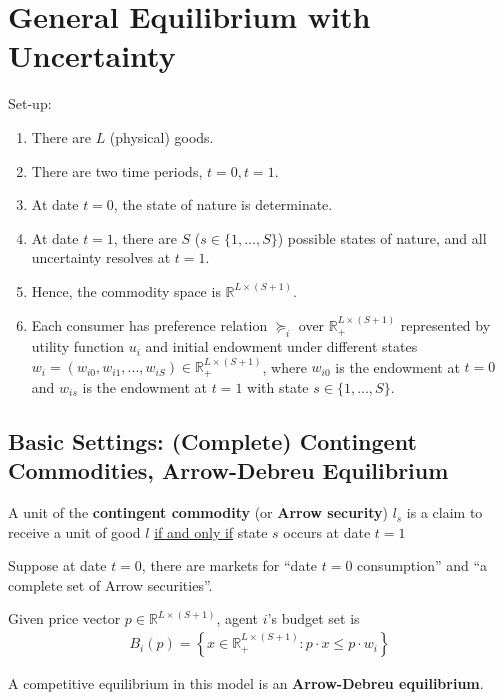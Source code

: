 \documentclass[11pt]{elegantbook}
\begin{document}
\section{General Equilibrium with Uncertainty}
Set-up:
\begin{enumerate}
    \item There are $L$ (physical) goods.
    \item There are two time periods, $t=0,t=1$.
    \item At date $t=0$, the state of nature is determinate.
    \item At date $t=1$, there are $S$ ($s\in\{1,...,S\}$) possible states of nature, and all uncertainty resolves at $t=1$.
    \item Hence, the commodity space is $\mathbb{R}^{L\times(S+1)}$.
    \item Each consumer has preference relation $\succeq_i$ over $\mathbb{R}_+^{L\times(S+1)}$ represented by utility function $u_i$ and initial endowment under different states $w_i=(w_{i0},w_{i1},...,w_{iS})\in \mathbb{R}_+^{L\times(S+1)}$, where $w_{i0}$ is the endowment at $t=0$ and $w_{is}$ is the endowment at $t=1$ with state $s\in\{1,...,S\}$.
\end{enumerate}

\subsection{Basic Settings: (Complete) Contingent Commodities, Arrow-Debreu Equilibrium}
\begin{definition}
    \normalfont
    A unit of the \textbf{contingent commodity} (or \textbf{Arrow security}) $l_s$ is a claim to receive a unit of good $l$ \underline{if and only if} state $s$ occurs at date $t=1$
\end{definition}
Suppose at date $t=0$, there are markets for ``date $t=0$ consumption'' and ``a complete set of Arrow securities''.

Given price vector $p\in \mathbb{R}^{L\times (S+1)}$, agent $i$'s budget set is
\begin{equation}
    \begin{aligned}
        B_i(p)=\left\{x\in \mathbb{R}_+^{L\times(S+1)}: p\cdot x\leq p\cdot w_i\right\}
    \end{aligned}
    \nonumber
\end{equation}
\begin{definition}
    \normalfont
    A competitive equilibrium in this model is an \textbf{Arrow-Debreu equilibrium}.
\end{definition}
\end{document}
